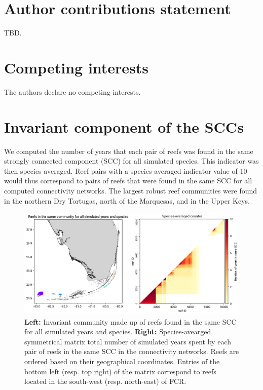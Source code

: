 \documentclass[preprint,12pt,authoryear]{elsarticle}
\begin{document}
	\section*{Author contributions statement}
	
	TBD.
	
	\section*{Competing interests}
	
	The authors declare no competing interests.
	
	
	
	
	\newpage
	
	
	\appendix
	
	\section{Invariant component of the SCCs}
	
	We computed the number of years that each pair of reefs was found in the same strongly connected component (SCC) for all simulated species. This indicator was then species-averaged. Reef pairs with a species-averaged indicator value of 10 would thus correspond to pairs of reefs that were found in the same SCC for all computed connectivity networks. The largest robust reef communities were found in the northern Dry Tortugas, north of the Marquesas, and in the Upper Keys.
	
	\begin{figure}[h!]
		\centering
		\includegraphics[width=\textwidth]{figures/mean_counter.png}
		\caption{\textbf{Left:} Invariant community made up of reefs found in the same SCC for all simulated years and species. \textbf{Right:} Species-avearged symmetrical matrix total number of simulated years spent by each pair of reefs in the same SCC in the connectivity networks. Reefs are ordered based on their geographical coordinates. Entries of the bottom left (resp. top right) of the matrix correspond to reefs located in the south-west (resp. north-east) of FCR.}\label{fig:mean_counter}
	\end{figure}
	
\end{document}
